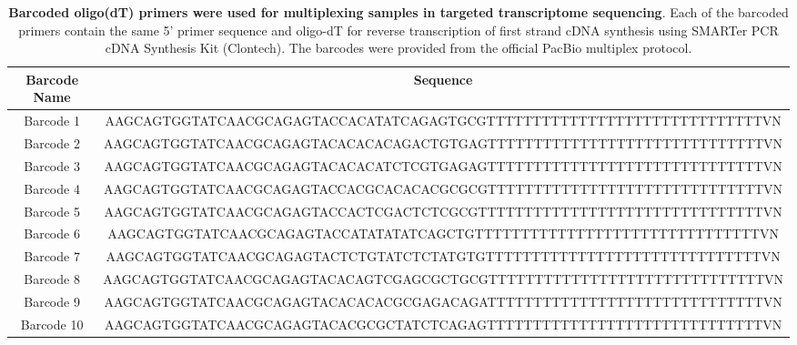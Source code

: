\begin{landscape}
	\vspace{1cm}
	\begin{table}[ht]
		\centering
		\captionsetup{justification=raggedright,width=1.5\textwidth}
		\caption[Barcoded oligo(dT) primers for targeted transcriptome sequencing]%
		{\textbf{Barcoded oligo(dT) primers were used for multiplexing samples in targeted transcriptome sequencing}. Each of the barcoded primers contain the same 5' primer sequence and oligo-dT for reverse transcription of first strand cDNA synthesis using SMARTer PCR cDNA Synthesis Kit (Clontech). The barcodes were provided from the official PacBio multiplex protocol.}
		\label{tab:barcode_primers}
		\begin{tabularx}{1.5\textwidth}{cc}
			\toprule
			Barcode Name & Sequence                                                                  \\ \midrule
			Barcode 1    & AAGCAGTGGTATCAACGCAGAGTACCACATATCAGAGTGCGTTTTTTTTTTTTTTTTTTTTTTTTTTTTTTVN \\
			Barcode 2    & AAGCAGTGGTATCAACGCAGAGTACACACACAGACTGTGAGTTTTTTTTTTTTTTTTTTTTTTTTTTTTTTVN \\
			Barcode 3    & AAGCAGTGGTATCAACGCAGAGTACACACATCTCGTGAGAGTTTTTTTTTTTTTTTTTTTTTTTTTTTTTTVN \\
			Barcode 4    & AAGCAGTGGTATCAACGCAGAGTACCACGCACACACGCGCGTTTTTTTTTTTTTTTTTTTTTTTTTTTTTTVN \\
			Barcode 5    & AAGCAGTGGTATCAACGCAGAGTACCACTCGACTCTCGCGTTTTTTTTTTTTTTTTTTTTTTTTTTTTTTTVN \\
			Barcode 6    & AAGCAGTGGTATCAACGCAGAGTACCATATATATCAGCTGTTTTTTTTTTTTTTTTTTTTTTTTTTTTTTTVN \\
			Barcode 7    & AAGCAGTGGTATCAACGCAGAGTACTCTGTATCTCTATGTGTTTTTTTTTTTTTTTTTTTTTTTTTTTTTTVN \\
			Barcode 8    & AAGCAGTGGTATCAACGCAGAGTACACAGTCGAGCGCTGCGTTTTTTTTTTTTTTTTTTTTTTTTTTTTTTVN \\
			Barcode 9    & AAGCAGTGGTATCAACGCAGAGTACACACACGCGAGACAGATTTTTTTTTTTTTTTTTTTTTTTTTTTTTTVN \\
			Barcode 10 & AAGCAGTGGTATCAACGCAGAGTACACGCGCTATCTCAGAGTTTTTTTTTTTTTTTTTTTTTTTTTTTTTTVN \\ \bottomrule
		\end{tabularx}
	\end{table}
\end{landscape}


